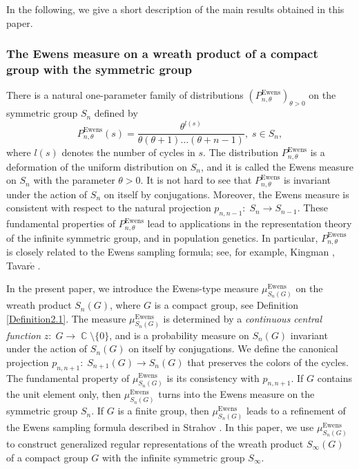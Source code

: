 \documentclass[12pt]{amsart}
\theoremstyle{definition}
\numberwithin{equation}{section}
\DeclareMathOperator{\C}{\mathbb{C}}
\DeclareMathOperator{\Ewens}{Ewens}
\begin{document}
In the following, we give a short description of the main results obtained in this paper.
\subsubsection{The Ewens measure on a wreath product of a compact group with the symmetric group} There is a natural one-parameter family of distributions $\left(P^{\Ewens}_{n,\theta}\right)_{\theta>0}$ on the symmetric group $S_n$ defined by
\begin{equation}\label{Res.1}
P^{\Ewens}_{n,\theta}(s)=\frac{\theta^{l(s)}}{\theta(\theta+1)\ldots(\theta+n-1)},\; s\in S_n,
\end{equation}
where $l(s)$ denotes the number of cycles in $s$. The distribution
$P^{\Ewens}_{n,\theta}$ is a deformation of the uniform distribution on $S_n$, and it is
called the Ewens measure on $S_n$ with the parameter $\theta>0$.
It is not hard to see that $P_{n,\theta}^{\Ewens}$ is invariant under the action
of $S_n$ on itself by conjugations. Moreover, the Ewens measure is consistent with respect to the natural projection $p_{n,n-1}:\; S_n\longrightarrow S_{n-1}$.
These fundamental properties of $P_{n,\theta}^{\Ewens}$ lead to applications in the representation theory of the infinite symmetric group, and in population genetics.
In particular, $P_{n,\theta}^{\Ewens}$ is closely related to the Ewens sampling formula; see, for example, Kingman \cite{Kingman1,Kingman2}, Tavar$\acute{\mbox{e}}$ \cite{Tavare}.

In the present paper, we introduce the Ewens-type measure $\mu_{S_n(G)}^{\Ewens}$ on the wreath product $S_n(G)$, where $G$ is a compact group, see Definition \ref{Definition2.1}.
The measure $\mu_{S_n(G)}^{\Ewens}$ is determined by a \textit{continuous central function} $z:\; G\longrightarrow\C\setminus\{0\}$, and is a probability measure on $S_n(G)$ invariant under the action of $S_n(G)$ on itself by conjugations.  We define the canonical projection $p_{n,n+1}:\; S_{n+1}(G)\longrightarrow S_n(G)$ that preserves the colors of the cycles.
The fundamental property of $\mu_{S_n(G)}^{\Ewens}$ is its consistency with $p_{n,n+1}$.
If $G$ contains the unit element only, then $\mu_{S_n(G)}^{\Ewens}$
turns into the Ewens measure on the symmetric group $S_n$. If $G$ is a finite group, then
$\mu_{S_n(G)}^{\Ewens}$ leads to a refinement of the Ewens sampling formula described in Strahov \cite{StrahovRefinement}. In this paper, we use $\mu_{S_n(G)}^{\Ewens}$
to construct generalized regular representations of the wreath product $S_{\infty}(G)$
of a compact group $G$ with the infinite symmetric group $S_{\infty}$.
\end{document}
